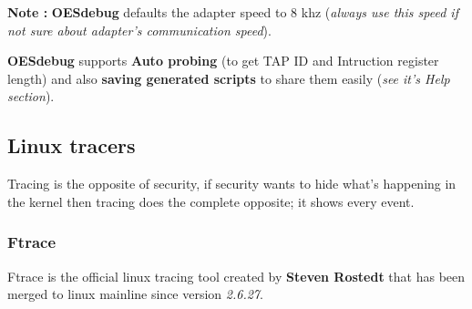 \begin{enumerate}
\begin{enumerate}
\textbf{\color{orange}Note :} \textbf{OESdebug} defaults the adapter speed to 8 khz (\textit{always use this speed if not sure about adapter's communication speed}). 	 
\begin{center}
\begin{mdframed}[
        linecolor=red,linewidth=2pt,%
        frametitlerule=true,%
        apptotikzsetting={\tikzset{mdfframetitlebackground/.append style={%
            shade,left color=white, right color=blue!20}}}, 
        frametitlerulecolor=blue,
        frametitlerulewidth=1pt, innertopmargin=\topskip,
        frametitle={OESdebug Extra features},
        outerlinewidth=1.25pt
    ]
	\textbf{OESdebug} supports \textbf{Auto probing} (to get TAP ID and Intruction register length) and also \textbf{saving generated scripts}  to share them easily (\textit{see it's Help section}).
\end{mdframed}
\end{center}

	\end{enumerate}
	
	
		
\end{enumerate}
	



\subsection{Linux tracers}
Tracing is the opposite of security, if security wants to hide what's happening in the kernel then tracing does the complete opposite; it shows every event.

\subsubsection{Ftrace}
Ftrace is the official linux tracing tool created by \og \textbf{Steven Rostedt} \fg that has been merged to linux mainline since version \emph{2.6.27}.

